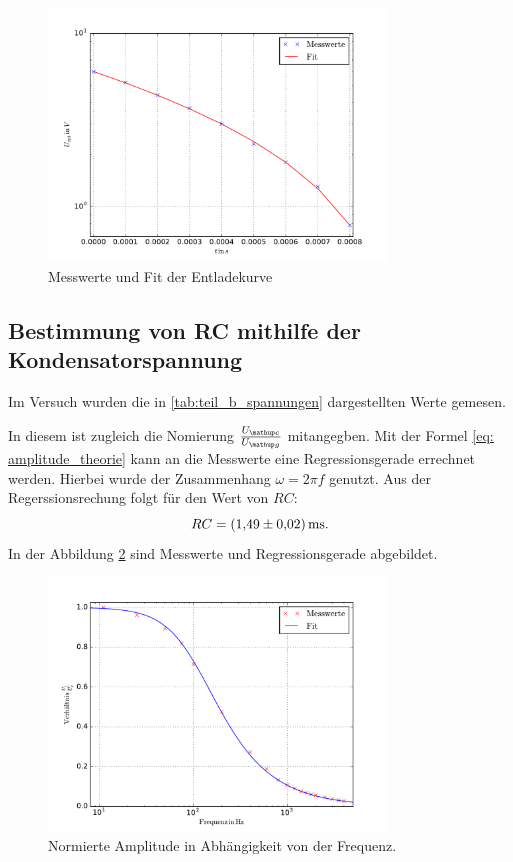 \begin{figure}
  \centering
  \includegraphics [width=0.8\textwidth]{pics/teil_a_entladung.pdf}
  \caption{Messwerte und Fit der Entladekurve}
  \label{fig:plot_teila}
\end{figure}
\subsection{Bestimmung von RC mithilfe der Kondensatorspannung}
Im Versuch wurden die in \ref{tab:teil_b_spannungen} dargestellten Werte gemesen.



In diesem ist zugleich die Nomierung $\frac{U\ua{c}}{U\ua{g}}$
mitangegben.
Mit der Formel \eqref{eq: amplitude_theorie} kann an die Messwerte eine Regressionsgerade
errechnet werden. Hierbei wurde der Zusammenhang $\omega=2\pi f$ genutzt.
Aus der Regerssionsrechung folgt für den Wert von $RC$:
\begin{equation}
  \label{eq:rc_teilb}
  RC=\SI{1.49\pm0.02}{\milli\second}.
\end{equation}
In der Abbildung \ref{fig:teilb} sind Messwerte und Regressionsgerade abgebildet.

\begin{figure}
  \centering
  \includegraphics[width=0.8\textwidth]{pics/u_cdurchu_g.pdf}
  \caption{Normierte Amplitude in Abhängigkeit von der Frequenz.}
  \label{fig:teilb}
\end{figure}

